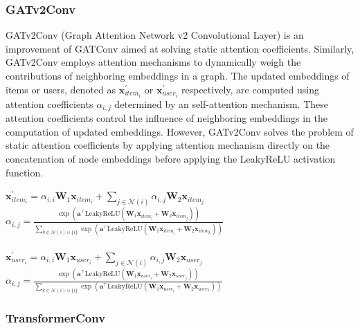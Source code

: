 \documentclass{scrartcl}
\begin{document}
\subsubsection{GATv2Conv\cite{gatv2conv}} 

\quad GATv2Conv (Graph Attention Network v2 Convolutional Layer) is an improvement of GATConv aimed at solving static attention coefficients. Similarly, GATv2Conv employs attention mechanisms to dynamically weigh the contributions of neighboring embeddings in a graph. The updated embeddings of items or users, denoted as $\mathbf{x}^{\prime}_{item_i}$ or $\mathbf{x}^{\prime}_{user_i}$ respectively, are computed using attention coefficients $\alpha_{i,j}$ determined by an self-attention mechanism. These attention coefficients control the influence of neighboring embeddings in the computation of updated embeddings. However, GATv2Conv solves the problem of static attention coefficients by applying attention mechanism directly on the concatenation of node embeddings before applying the LeakyReLU activation function. \\

\begin{center}
    $\mathbf{x}^{\prime}_{item_{i}} = \alpha_{i,i}\mathbf{W}_{1}\mathbf{x}_{item_{i}} + \sum_{j \in \mathcal{N}(i)} \alpha_{i,j}\mathbf{W}_{2}\mathbf{x}_{item_{j}}$ \\ 
    $\alpha_{i,j} = \frac{\exp\left(\mathbf{a}^{\top}\mathrm{LeakyReLU}\left(\mathbf{W}_{1} \mathbf{x}_{item_{i}} + \mathbf{W}_{2} \mathbf{x}_{item_{j}}\right)\right)}{\sum_{k \in \mathcal{N}(i) \cup \{ i \}} \exp\left(\mathbf{a}^{\top}\mathrm{LeakyReLU}\left(\mathbf{W}_{1} \mathbf{x}_{item_{i}} + \mathbf{W}_{2} \mathbf{x}_{item_{k}}\right)\right)}$ \\~\\
    $\mathbf{x}^{\prime}_{user_{i}} = \alpha_{i,i}\mathbf{W}_{1}\mathbf{x}_{user_{i}} + \sum_{j \in \mathcal{N}(i)} \alpha_{i,j}\mathbf{W}_{2}\mathbf{x}_{user_{j}}$ \\ 
    $\alpha_{i,j} = \frac{\exp\left(\mathbf{a}^{\top}\mathrm{LeakyReLU}\left(\mathbf{W}_{1} \mathbf{x}_{user_{i}} + \mathbf{W}_{2} \mathbf{x}_{user_{j}}\right)\right)}{\sum_{k \in \mathcal{N}(i) \cup \{ i \}} \exp\left(\mathbf{a}^{\top}\mathrm{LeakyReLU}\left(\mathbf{W}_{1} \mathbf{x}_{user_{i}} + \mathbf{W}_{2} \mathbf{x}_{user_{k}}\right)\right)}$
\end{center}

\subsubsection{TransformerConv\cite{transformerconv}} 
\end{document}

